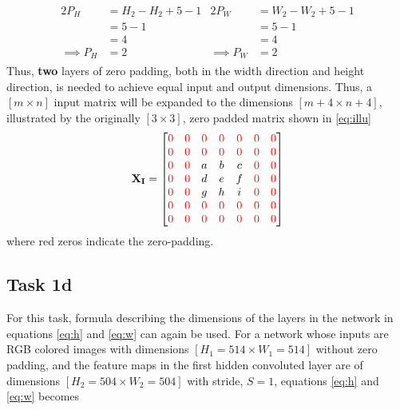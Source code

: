\documentclass{article}
\begin{document}
\begin{align}
    \begin{split}
        2P_H &= H_2 - H_2 +5 -1 \\
        &= 5-1 \\ 
        &= 4 \\
        \implies P_H &=2
    \end{split}
    \begin{split}
        2P_W &= W_2 - W_2 +5 -1 \\
        &= 5-1 \\ &= 4 \\
        \implies P_W &=2
    \end{split}
\end{align}
Thus, \textbf{two} layers of zero padding, both in the width direction and height direction, is needed to achieve equal input and output dimensions. Thus, a $[m\times n]$ input matrix will be expanded to the dimensions $[m +4 \times n + 4]$, illustrated by the originally $[3\times 3]$, zero padded matrix shown in \eqref{eq:illu}
\begin{equation}\def\r{\color{red}}\def\b{\color{blue}}
    \mathbf{X_I} = \begin{bmatrix}
    \r0&\r0 &\r0&\r0&\r0&\r0&   \r0 \\
        \r0&\r0 &\r0&\r0&\r0&\r0    &\r0 \\
         \r0&\r 0&   a & b & c&\r0    &\r0\\
         \r0&\r 0&     d & e & f&\r0&    \r0 \\
          \r0&\r0&     g& h & i&\r0    &\r0 \\
          \r0&\r0&\r0&\r0&\r0&\r0    &\r0\\
                    \r0&\r0&\r0&\r0&\r0&\r0   & \r0\\
    \end{bmatrix}
    \label{eq:illu}
\end{equation}
where red zeros indicate the zero-padding.

\subsection{Task 1d} \label{sec:t1d}
For this task, formula describing the dimensions of the layers in the network in equations \eqref{eq:h} and \eqref{eq:w} can again be used. For a network whose inputs are RGB colored images with dimensions $[H_1 = 514 \times W_1 = 514]$ without zero padding, and the feature maps in the first hidden convoluted layer are of dimensions $[H_2 = 504 \times W_2 = 504]$ with stride, $S=1$, equations \eqref{eq:h} and \eqref{eq:w} becomes 
\end{document}
